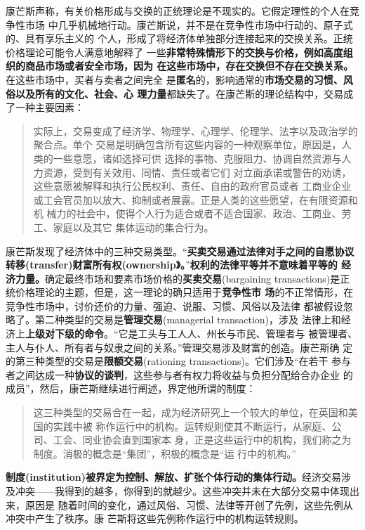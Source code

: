 康芒斯声称，有关价格形成与交换的正统理论是不现实的。它假定理性的个人在竞争性市场
中几乎机械地行动。康芒斯说，并不是在竞争性市场中行动的、原子式的、具有享乐主义的
个人，形成了将经济体单独部分连接起来的交换关系。正统价格理论可能令人满意地解释了
一些\textbf{非常特殊情形下的交换与价格，例如高度组织的商品市场或者安全市场，因为
  在这些市场中，存在交换但不存在交换关系。}在这些市场中，买者与卖者之间完全
是\textbf{匿名}的，影响通常的\textbf{市场交易的习惯、风俗以及所有的文化、社会、心
  理力量}都缺失了。在康芒斯的理论结构中，交易成了一种主要因素：

\begin{quotation}
  实际上，交易变成了经济学、物理学、心理学、伦理学、法字以及政治学的聚合点。单个
  交易是明确包含所有这些内容的一种观察单位，原因是，人类的一些意愿，诸如选择可供
  选择的事物、克服阻力、协调自然资源与人力资源，受到有关效用、同情、责任或者它们
  对立面承诺或警告的劝诱，这些意愿被解释和执行公民权利、责任、自由的政府官员或者
  工商业企业或工会官员加以放大、抑制或者展露。正是人类的这些愿望，在有限资源和机
  械力的社会中，使得个人行为适合或者不适合国家、政治、工商业、劳工、家庭以及其它
  集体运动的集合行为。
\end{quotation}

康芒斯发现了经济体中的三种交易类型。“\textbf{买卖交易通过法律对手之间的自愿协议
  转移(transfer)财富所有权(ownership》。}”\textbf{权利的法律平等并不意味着平等的
  经济力量。}确定最终市场和要素市场价格的\textbf{买卖交易}(bargaining
transactions)是正统价格理论的主题，但是，这一理论的确只适用于\textbf{竞争性市
  场}的不正常情形，在竞争性市场中，讨价还价的力量、强迫、说服、习惯、风俗以及法律
都被假设忽略了。第二种类型的交易是\textbf{管理交易}(managerial transaction)，涉及
法律上和经济上\textbf{上级对下级的命令}。“它是工头与工人人、州长与市民、管理者与
被管理者、主人与仆人、所有者与奴隶之间的关系。”管理交易涉及财富的创造。康芒斯确
定的第三种类型的交易是\textbf{限额交易}(rationing transactions)。它们涉及“在若干
参与者之间达成一种\textbf{协议的谈判}，这些参与者有权力将收益与负担分配给合办企业
的成员”，然后，康芒斯继续进行阐述，界定他所谓的制度：

\begin{quotation}
  这三种类型的交易合在一起，成为经济研究上一个较大的单位，在英国和美国的实践中被
  称作运行中的机构。运转规则使其不断运行，从家庭、公司、工会、同业协会直到国家本
  身，正是这些运行中的机构，我们称之为制度。消极的概念是“集团”，积极的概念是“运
  行中的机构。”
\end{quotation}

\textbf{制度(institution)被界定为控制、解放、扩张个体行动的集体行动。}经济交易涉
及冲突——我得到的越多，你得到的就越少。这些冲突并未在大部分交易中体现出来，原因是
随着时间的变化，通过风俗、习惯、法律等开创了先例，这些先例从冲突中产生了秩序。康
芒斯将这些先例称作运行中的机构运转规则。

